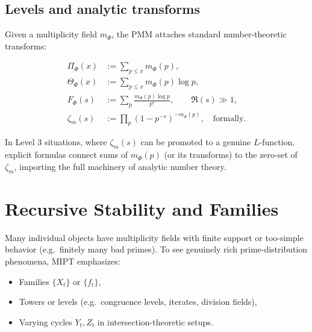 \documentclass[11pt]{article}
\theoremstyle{definition}
\theoremstyle{plain}
\theoremstyle{remark}
\newcommand{\1}{\mathbb{1}}
\begin{document}
\subsection{Levels and analytic transforms}

Given a multiplicity field \(m_\Phi\), the PMM attaches standard number-theoretic transforms:

\begin{align*}
  \Pi_\Phi(x) &:= \sum_{p\le x} m_\Phi(p),\\
  \Theta_\Phi(x) &:= \sum_{p\le x} m_\Phi(p)\log p,\\
  F_\Phi(s) &:= \sum_p \frac{m_\Phi(p)\log p}{p^s},\qquad \Re(s)\gg 1,\\
  \zeta_m(s) &:= \prod_p (1-p^{-s})^{-m_\Phi(p)},\quad \text{formally}.
\end{align*}

In Level 3 situations, where \(\zeta_m(s)\) can be promoted to a genuine \(L\)-function, explicit formulas connect sums of \(m_\Phi(p)\) (or its transforms) to the zero-set of \(\zeta_m\), importing the full machinery of analytic number theory.

\section{Recursive Stability and Families}

Many individual objects have multiplicity fields with finite support or too-simple behavior (e.g.\ finitely many bad primes). To see genuinely rich prime-distribution phenomena, MIPT emphasizes:

\begin{itemize}[leftmargin=*]
  \item Families \(\{X_t\}\) or \(\{f_t\}\),
  \item Towers or levels (e.g.\ congruence levels, iterates, division fields),
  \item Varying cycles \(Y_t,Z_t\) in intersection-theoretic setups.
\end{itemize}
\end{document}
